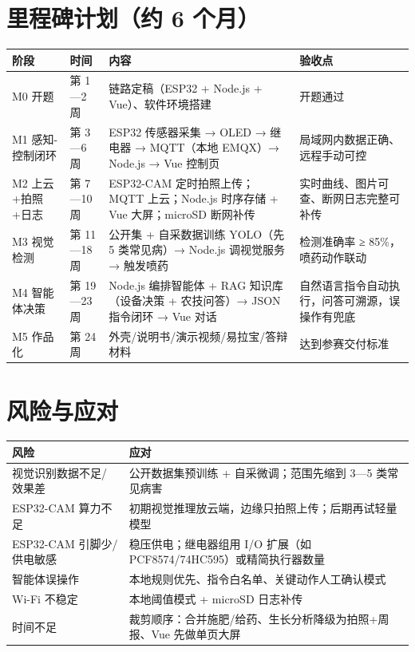 ﻿\documentclass[11pt]{ctexart}
\begin{document}
\section{里程碑计划（约 6 个月）}
\begin{longtable}{p{2.2cm}p{1.7cm}p{6.5cm}p{4.0cm}}
  \toprule
  阶段 & 时间 & 内容 & 验收点 \\
  \midrule
  M0 开题 & 第 1—2 周 & 链路定稿（ESP32 + Node.js + Vue）、软件环境搭建 & 开题通过 \\
  M1 感知-控制闭环 & 第 3—6 周 & ESP32 传感器采集 → OLED → 继电器 → MQTT（本地 EMQX）→ Node.js → Vue 控制页 & 局域网内数据正确、远程手动可控 \\
  M2 上云+拍照+日志 & 第 7—10 周 & ESP32-CAM 定时拍照上传；MQTT 上云；Node.js 时序存储 + Vue 大屏；microSD 断网补传 & 实时曲线、图片可查、断网日志完整可补传 \\
  M3 视觉检测 & 第 11—18 周 & 公开集 + 自采数据训练 YOLO（先 5 类常见病）→ Node.js 调视觉服务 → 触发喷药 & 检测准确率 ≥ 85\%，喷药动作联动 \\
  M4 智能体决策 & 第 19—23 周 & Node.js 编排智能体 + RAG 知识库（设备决策 + 农技问答）→ JSON 指令闭环 → Vue 对话 & 自然语言指令自动执行，问答可溯源，误操作有兜底 \\
  M5 作品化 & 第 24 周 & 外壳/说明书/演示视频/易拉宝/答辩材料 & 达到参赛交付标准 \\
  \bottomrule
\end{longtable}

\section{风险与应对}
\begin{longtable}{p{5.2cm}p{10.0cm}}
  \toprule
  风险 & 应对 \\
  \midrule
  视觉识别数据不足/效果差 & 公开数据集预训练 + 自采微调；范围先缩到 3—5 类常见病害 \\
  ESP32-CAM 算力不足 & 初期视觉推理放云端，边缘只拍照上传；后期再试轻量模型 \\
  ESP32-CAM 引脚少/供电敏感 & 稳压供电；继电器组用 I/O 扩展（如 PCF8574/74HC595）或精简执行器数量 \\
  智能体误操作 & 本地规则优先、指令白名单、关键动作人工确认模式 \\
  Wi-Fi 不稳定 & 本地阈值模式 + microSD 日志补传 \\
  时间不足 & 裁剪顺序：合并施肥/给药、生长分析降级为拍照+周报、Vue 先做单页大屏 \\
  \bottomrule
\end{longtable}
\end{document}
